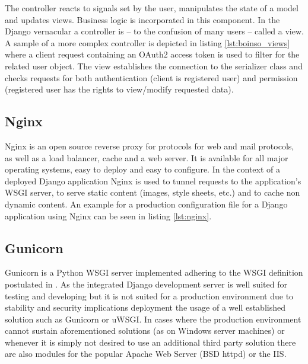 \documentclass[BachelorPaper]{subfiles}
\begin{document}


The controller reacts to signals set by the user, manipulates the state of a model and updates views. Business logic is incorporated in this component. In the Django vernacular a controller is -- to the confusion of many users -- called a view. A sample of a more complex controller is depicted in listing \ref{lst:boinso_views} where a client request containing an OAuth2 access token is used to filter for the related user object. The view establishes the connection to the serializer class and checks requests for both authentication (client is registered user) and permission (registered user has the rights to view/modify requested data).\\



\subsection{Nginx}
\label{subsec:mat_nginx}
Nginx is an open source reverse proxy for protocols for web and mail protocols, as well as a load balancer, cache and a web server. It is available for all major operating systems, easy to deploy and easy to configure. In the context of a deployed Django application Nginx is used to tunnel requests to the application's \ac{WSGI} server, to serve static content (images, style sheets, etc.) and to cache non dynamic content. An example for a production configuration file for a Django application using Nginx can be seen in listing \ref{lst:nginx}.\\



\subsection{Gunicorn}
\label{subsec:mat_gunicorn}
Gunicorn is a Python \ac{WSGI} server implemented adhering to the \ac{WSGI} definition postulated in \cite{pep_0333}. As the integrated Django development server is well suited for testing and developing but it is not suited for a production environment due to stability and security implications deployment the usage of a well established solution such as Gunicorn or uWSGI. In cases where the production environment cannot sustain aforementioned solutions (as on Windows server machines) or whenever it is simply not desired to use an additional third party solution there are also modules for the popular Apache Web Server (\ac{BSD} httpd) or the \ac{IIS}.\\
\end{document}
